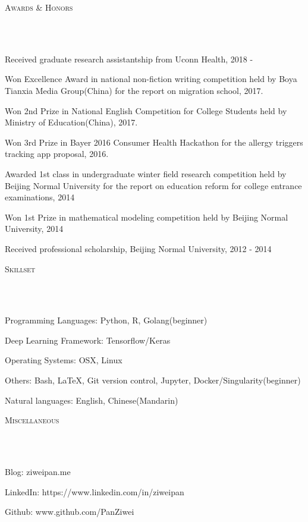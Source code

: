 \documentclass{article}
\newcommand{\header}[1]{{
\hspace*{-15pt}\vspace*{6pt} \textsc{#1}} \vspace*{-6pt} 
\lineunder
}
\newcommand{\lineunder}{
\vspace*{-8pt} \\ \hspace*{-18pt} 
\hrulefill \\
}
\renewcommand{\labelitemii}{
$\vcenter{\hbox{\tiny$\bullet$}}$\hspace*{-3pt}
}
\newenvironment{bullet-list-major}{
\begin{list}{\labelitemii}{\setlength\leftmargin{3pt} 
\topsep 0pt \itemsep -2pt}}{\vspace*{4pt}\end{list}
}
\begin{document}
\vspace*{4pt}%
\header{Awards \& Honors}
    \begin{bullet-list-major}
    \item Received graduate research assistantship from Uconn Health, 2018 -
    \vspace{2pt}
    \item Won Excellence Award in national non-fiction writing competition held by Boya Tianxia Media Group(China) for the report on migration school, 2017.
    \vspace{2pt}
    \item Won 2nd Prize in National English Competition for College Students held by Ministry of Education(China), 2017.
    \vspace{2pt}
    \item Won 3rd Prize in Bayer 2016 Consumer Health Hackathon for the allergy triggers tracking app proposal, 2016.
    \vspace{2pt}
    \item Awarded 1st class in undergraduate winter field research competition held by Beijing Normal University for the report on education reform for college entrance examinations, 2014
    \vspace{2pt}
    \item Won 1st Prize in mathematical modeling competition held by Beijing Normal University, 2014
    \item Received professional scholarship, Beijing Normal University, 2012 - 2014 
    \end{bullet-list-major}
    
    
\vspace*{4pt}%
\header{Skillset}
    \begin{bullet-list-major}
    \item Programming Languages: Python, R, Golang(beginner)
    \vspace{2pt}
    \item Deep Learning Framework: Tensorflow/Keras
    \vspace{2pt}
    \item Operating Systems: OSX, Linux
    \vspace{2pt}
    \item Others: Bash, LaTeX, Git version control,  Jupyter, Docker/Singularity(beginner)
    \vspace{2pt}
    \item Natural languages: English, Chinese(Mandarin)
    \end{bullet-list-major}


    
\vspace*{4pt}%
\header{Miscellaneous}
    \begin{bullet-list-major}
    \item Blog: ziweipan.me
    \vspace{2pt}
    \item LinkedIn: https://www.linkedin.com/in/ziweipan
    \vspace{2pt}
    \item Github: www.github.com/PanZiwei
    \vspace{2pt}
    \end{bullet-list-major}
\end{document}
